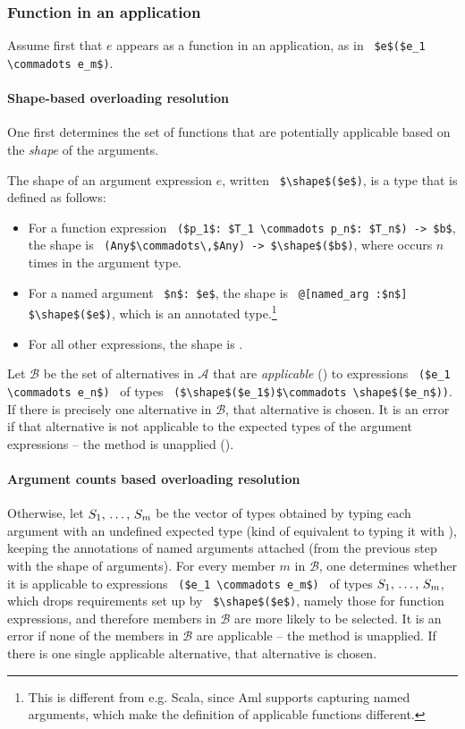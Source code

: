 \subsubsection{Function in an application}

Assume first that $e$ appears as a function in an application, as in ~\lstinline!$e$($e_1 \commadots e_m$)!.

\paragraph{Shape-based overloading resolution}
One first determines the set of functions that are potentially applicable based on the {\em shape} of the arguments. 

The shape of an argument expression $e$, written ~\lstinline!$\shape$($e$)!, is a type that is defined as follows:
\begin{itemize}
\item For a function expression ~\lstinline!($p_1$: $T_1 \commadots p_n$: $T_n$) -> $b$!, the shape is ~\lstinline!(Any$\commadots\,$Any) -> $\shape$($b$)!, where  occurs $n$ times in the argument type. 
\item For a named argument ~\lstinline!$n$: $e$!, the shape is ~\lstinline!@[named_arg :$n$] $\shape$($e$)!, which is an annotated type.\footnote{This is different from e.g. Scala, since Aml supports capturing named arguments, which make the definition of applicable functions different.} %
\item For all other expressions, the shape is . 
\end{itemize}

Let $\mathcal{B}$ be the set of alternatives in $\mathcal{A}$ that are {\em applicable} () to expressions ~\lstinline!($e_1 \commadots e_n$)!~ of types ~\lstinline!($\shape$($e_1$)$\commadots \shape$($e_n$))!. If there is precisely one alternative in $\mathcal{B}$, that alternative is chosen. It is an error if that alternative is not applicable to the expected types of the argument expressions -- the method is unapplied (). 

\paragraph{Argument counts based overloading resolution}
Otherwise, let $S_1 ,\, \ldots ,\, S_m$ be the vector of types obtained by typing each argument with an undefined expected type (kind of equivalent to typing it with ), keeping the annotations of named arguments attached (from the previous step with the shape of arguments). For every member $m$ in $\mathcal{B}$, one determines whether it is applicable to expressions ~\lstinline!($e_1 \commadots e_m$)!~ of types $S_1 ,\, \ldots ,\, S_m$, which drops requirements set up by ~\lstinline!$\shape$($e$)!, namely those for function expressions, and therefore members in $\mathcal{B}$ are more likely to be selected. It is an error if none of the members in $\mathcal{B}$ are applicable -- the method is unapplied. If there is one single applicable alternative, that alternative is chosen. 

